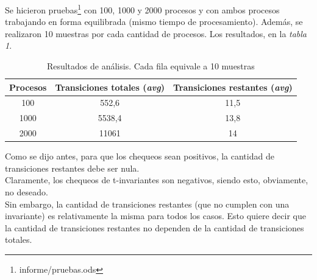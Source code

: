 \documentclass{article}
\newcommand{\fnpruebas}{informe/pruebas.ods}
\begin{document}
\begin{flushleft}
        Se hicieron pruebas\footnote{\fnpruebas} con 100, 1000 y 2000 procesos y con ambos procesos trabajando en forma
        equilibrada (mismo tiempo de procesamiento). Además, se realizaron 10 muestras por cada 
        cantidad de procesos. Los resultados, en la \emph{tabla 1}.\newline \newline
        \begin{center}
            \begin{table}[h]
                \begin{tabular}{||c|c|c||} 
                    \hline
                    Procesos & Transiciones totales (\emph{avg}) & Transiciones restantes (\emph{avg}) \\ [0.5ex] 
                    \hline\hline
                    100 & 552,6 & 11,5 \\ 
                    \hline
                    1000 & 5538,4 & 13,8 \\
                    \hline
                    2000 & 11061 & 14 \\
                    \hline
               \end{tabular}
               \caption{Resultados de análisis. Cada fila equivale a 10 muestras}
            \end{table}
        \end{center}
        Como se dijo antes, para que los chequeos sean positivos, la cantidad de transiciones restantes
        debe ser nula. \\
        Claramente, los chequeos de t-invariantes son negativos, siendo esto, obviamente, no deseado. \\
        Sin embargo, la cantidad de transiciones restantes (que no cumplen con una invariante) es 
        relativamente la misma para todos los casos. Esto quiere decir que la cantidad de transiciones
        restantes no dependen de la cantidad de transiciones totales.
    \end{flushleft}
\end{document}
